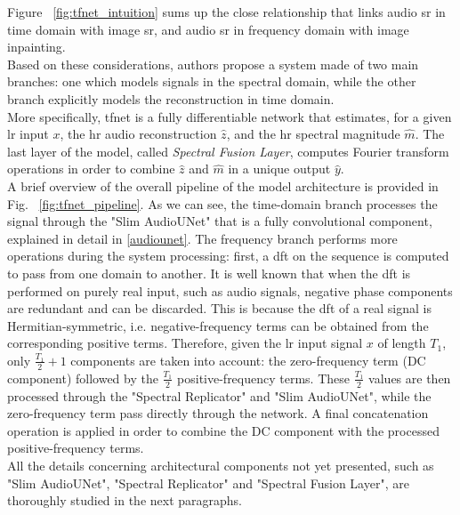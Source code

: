 \noindent Figure ~\ref{fig:tfnet_intuition} sums up the close relationship that links audio \gls{sr} in time domain with image \gls{sr}, and audio \gls{sr} in frequency domain with image inpainting. \\
Based on these considerations, authors propose a system made of two main branches: one which models signals in the spectral domain, while the other branch explicitly models the reconstruction in time domain. \\
More specifically, \gls{tfnet} is a fully differentiable network that estimates, for a given \gls{lr} input $x$, the \gls{hr} audio reconstruction $\hat{z}$, and the \gls{hr} spectral magnitude $\hat{m}$. The last layer of the model, called \textit{Spectral Fusion Layer}, computes Fourier transform operations in order to combine $\hat{z}$ and $\hat{m}$ in a unique output $\hat{y}$. \\
A brief overview of the overall pipeline of the model architecture is provided in Fig. ~\ref{fig:tfnet_pipeline}. As we can see, the time-domain branch processes the signal through the "Slim AudioUNet" that is a fully convolutional component, explained in detail in \ref{audiounet}. The frequency branch performs more operations during the system processing: first, a \gls{dft} on the sequence is computed to pass from one domain to another. It is well known that when the \gls{dft} is performed on purely real input, such as audio signals, negative phase components are redundant and can be discarded. This is because the \gls{dft} of a real signal is Hermitian-symmetric, i.e. negative-frequency terms can be obtained from the corresponding positive terms. Therefore, given the \gls{lr} input signal $x$ of length $T_1$, only $\frac{T_1}{2} + 1$ components are taken into account: the zero-frequency term (DC component) followed by the $\frac{T_1}{2}$ positive-frequency terms. These $\frac{T_1}{2}$ values are then processed through the "Spectral Replicator" and "Slim AudioUNet", while the zero-frequency term pass directly through the network. A final concatenation operation is  applied in order to combine the DC component with the processed positive-frequency terms. \\
All the details concerning architectural components not yet presented, such as "Slim AudioUNet", "Spectral Replicator" and "Spectral Fusion Layer", are thoroughly studied in the next paragraphs. 

